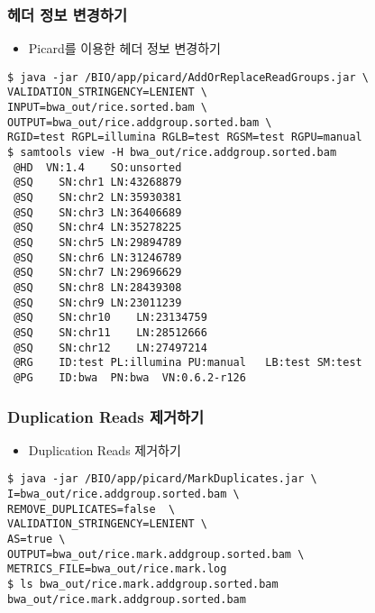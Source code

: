 \documentclass{article}
\begin{document}
\subsubsection{헤더 정보 변경하기}
\begin{itemize}
\item
  \begin{itemize}
  Picard를 이용한 헤더 정보 변경하기  
  \end{itemize}
\end{itemize}
\begin{lstlisting}[frame=single,style=Bash,xleftmargin=1.4cm,xrightmargin=1.4cm]
$ java -jar /BIO/app/picard/AddOrReplaceReadGroups.jar \
VALIDATION_STRINGENCY=LENIENT \
INPUT=bwa_out/rice.sorted.bam \
OUTPUT=bwa_out/rice.addgroup.sorted.bam \
RGID=test RGPL=illumina RGLB=test RGSM=test RGPU=manual
$ samtools view -H bwa_out/rice.addgroup.sorted.bam 
 @HD  VN:1.4	SO:unsorted
 @SQ	SN:chr1	LN:43268879
 @SQ	SN:chr2	LN:35930381
 @SQ	SN:chr3	LN:36406689
 @SQ	SN:chr4	LN:35278225
 @SQ	SN:chr5	LN:29894789
 @SQ	SN:chr6	LN:31246789
 @SQ	SN:chr7	LN:29696629
 @SQ	SN:chr8	LN:28439308
 @SQ	SN:chr9	LN:23011239
 @SQ	SN:chr10	LN:23134759
 @SQ	SN:chr11	LN:28512666
 @SQ	SN:chr12	LN:27497214
 @RG	ID:test	PL:illumina	PU:manual	LB:test	SM:test
 @PG	ID:bwa	PN:bwa	VN:0.6.2-r126
\end{lstlisting}

\subsubsection{Duplication Reads 제거하기}
\begin{itemize}
\item
  \begin{itemize}
  Duplication Reads 제거하기  
  \end{itemize}
\end{itemize}
\begin{lstlisting}[frame=single,style=Bash,xleftmargin=1.4cm,xrightmargin=1.4cm]
$ java -jar /BIO/app/picard/MarkDuplicates.jar \
I=bwa_out/rice.addgroup.sorted.bam \
REMOVE_DUPLICATES=false  \
VALIDATION_STRINGENCY=LENIENT \
AS=true \
OUTPUT=bwa_out/rice.mark.addgroup.sorted.bam \
METRICS_FILE=bwa_out/rice.mark.log
$ ls bwa_out/rice.mark.addgroup.sorted.bam 
bwa_out/rice.mark.addgroup.sorted.bam
\end{lstlisting}
\end{document}
